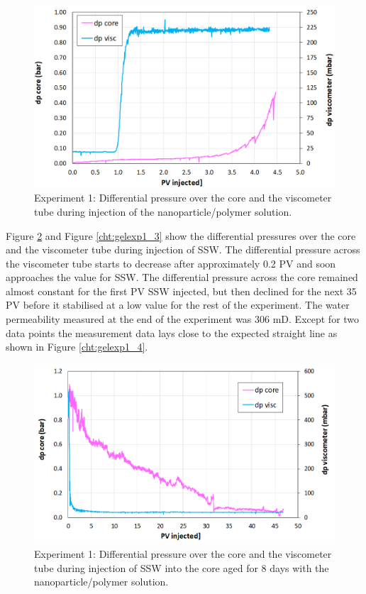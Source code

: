 \begin{figure}[h!]
    \centering
    \includegraphics[width=\textwidth]{img/cht/gelexp1_1.png}
    \caption{Experiment 1: Differential pressure over the core and the viscometer tube during injection of the nanoparticle/polymer solution.}
    \label{cht:gelexp1_1} %
\end{figure}

Figure \ref{cht:gelexp1_2} and Figure \ref{cht:gelexp1_3} show the differential pressures over the core and the viscometer tube during injection of SSW. The differential pressure across the viscometer tube starts to decrease after approximately 0.2 PV and soon approaches the value for SSW. The differential pressure across the core remained almost constant for the first PV SSW injected, but then declined for the next 35 PV before it stabilised at a low value for the rest of the experiment. The water permeability measured at the end of the experiment was 306 mD. Except for two data points the measurement data lays close to the expected straight line as shown in Figure \ref{cht:gelexp1_4}.

\begin{figure}[h!]
    \centering
    \includegraphics[width=\textwidth]{img/cht/gelexp1_2.png}
    \caption{Experiment 1: Differential pressure over the core and the viscometer tube during injection of SSW into the core aged for 8 days with the nanoparticle/polymer solution.}
    \label{cht:gelexp1_2} %
\end{figure}

